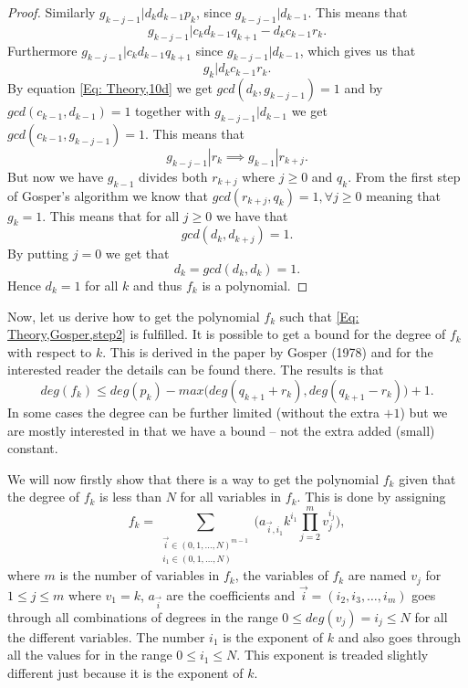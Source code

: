 \begin{proof}
  Similarly $g_{k-j-1}|d_kd_{k-1}p_k$, since $g_{k-j-1}|d_{k-1}$. This means that
  \begin{equation}
    g_{k-j-1}|c_kd_{k-1}q_{k+1}-d_kc_{k-1}r_k.
  \end{equation}
  Furthermore $g_{k-j-1}|c_kd_{k-1}q_{k+1}$ since $g_{k-j-1}|d_{k-1}$, which gives us that
  \begin{equation}
    g_k|d_kc_{k-1}r_k.
  \end{equation}
  By equation \ref{Eq: Theory,10d} we get $gcd(d_k,g_{k-j-1})=1$ and by $gcd(c_{k-1},d_{k-1})=1$ together with $g_{k-j-1}|d_{k-1}$ we get $gcd(c_{k-1},g_{k-j-1})=1$. This means that
  \begin{equation}
    g_{k-j-1}|r_k \implies g_{k-1}|r_{k+j}.
  \end{equation}
  But now we have $g_{k-1}$ divides both $r_{k+j}$ where $j\geq 0$ and $q_k$. From the first step of Gosper's algorithm we know that $gcd(r_{k+j},q_k)=1, \forall j\geq 0$ meaning that $g_k=1$. This means that for all $j\geq 0$ we have that
  \begin{equation}
    gcd(d_k,d_{k+j})=1.
  \end{equation}
  By putting $j=0$ we get that
  \begin{equation}
    d_k = gcd(d_k,d_k) = 1.
  \end{equation}
  Hence $d_k=1$ for all $k$ and thus $f_k$ is a polynomial.
\end{proof}

Now, let us derive how to get the polynomial $f_k$ such that \ref{Eq: Theory,Gosper,step2} is fulfilled. It is possible to get a bound for the degree of $f_k$ with respect to $k$. This is derived in the paper by Gosper (1978) and for the interested reader the details can be found there. The results is that
\begin{equation}
  deg(f_k)\leq deg(p_k) - max\big(deg(q_{k+1}+r_k),deg(q_{k+1}-r_k)\big) + 1.
\end{equation}
In some cases the degree can be further limited (without the extra $+1$) but we are mostly interested in that we have a bound -- not the extra added (small) constant.

We will now firstly show that there is a way to get the polynomial $f_k$ given that the degree of $f_k$ is less than $N$ for all variables in $f_k$. This is done by assigning
\begin{equation}\label{Eq: Theory,general polynomial}
  f_k = \sum_{\substack{\vec{i}\in (0,1,\ldots,N)^{m-1}\\i_1\in (0,1,\ldots,N)}} \Big(a_{\vec{i},i_1}k^{i_1}\prod_{j=2}^m v_j^{i_j}\Big),
\end{equation}
where $m$ is the number of variables in $f_k$, the variables of $f_k$ are named $v_j$ for $1\leq j\leq m$ where $v_1=k$, $a_\vec{i}$ are the coefficients and $\vec{i}=(i_2,i_3,\ldots,i_m)$ goes through all combinations of degrees in the range $0\leq deg(v_j)=i_j\leq N$ for all the different variables. The number $i_1$ is the exponent of $k$ and also goes through all the values for in the range $0\leq i_1\leq N$. This exponent is treaded slightly different just because it is the exponent of $k$.

